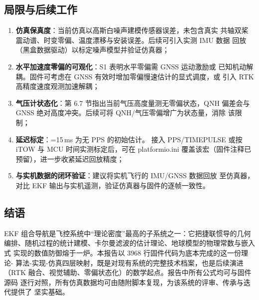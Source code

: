 \subsection{局限与后续工作}

\begin{enumerate}
  \item \textbf{仿真保真度}：当前仿真以高斯白噪声建模传感器误差，未包含真实
    共轴双桨震动谱、时变零偏、温度漂移与安装误差。后续可引入实测 IMU 数据
    回放（黑盒数据驱动）以标定噪声模型并验证仿真器；
  \item \textbf{水平加速度零偏的可观化}：S1 表明水平零偏需 GNSS 运动激励或
    已知机动解耦。固件可考虑在 GNSS 有效时增加零偏慢速估计的显式调度，或
    引入 RTK 高精度速度观测加速解耦；
  \item \textbf{气压计状态化}：第 6.7 节指出当前气压高度量测无零偏状态，QNH
    偏差会与 GNSS 绝对高度冲突。后续可将 QNH/气压零偏增广为状态量，消除
    该限制；
  \item \textbf{延迟标定}：=15\,ms 为无 PPS 的初始估计。
    接入 PPS/TIMEPULSE 或按 iTOW 与 MCU 时间实测标定后，可在
    platformio.ini 覆盖该宏（固件注释已预留），进一步收紧延迟回放精度；
  \item \textbf{与实机数据的闭环验证}：建议将实机飞行的 IMU/GNSS 数据回放
    至仿真器，对比 EKF 输出与实机遥测，验证仿真器与固件的逐帧一致性。
\end{enumerate}

\subsection{结语}

EKF 组合导航是飞控系统中``理论密度''最高的子系统之一：它把捷联惯导的几何
编排、随机过程的统计建模、卡尔曼滤波的估计理论、地球模型的物理常数与嵌入式
实现的数值防御熔于一炉。本报告以 3968 行固件代码为底本完成的这一份理论-
算法-实现-仿真四层映射，既是对现有系统的完整技术档案，也是后续演进
（RTK 融合、视觉辅助、零偏状态化）的数学起点。报告中所有公式均可与固件源码
逐行对照，所有仿真数据均可由随附脚本复现，为该系统的评审、传承与迭代提供了
坚实基础。

